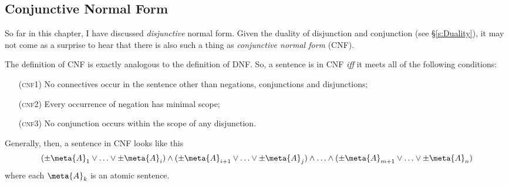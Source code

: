 \subsection{Conjunctive Normal Form}\label{s:CNF}
So far in this chapter, I have discussed \emph{disjunctive} normal form. Given the duality of disjunction and conjunction (see \S\ref{s:Duality}), it may not come as a surprise to hear that there is also such a thing as \emph{conjunctive normal form} (CNF).

The definition of CNF is exactly analogous to the definition of DNF. So, a sentence is in CNF \emph{iff} it meets all of the following conditions:
	\begin{itemize}
		\item[(\textsc{cnf1})] No connectives occur in the sentence other than negations, conjunctions and disjunctions;
		\item[(\textsc{cnf2})] Every occurrence of negation has minimal scope;
		\item[(\textsc{cnf3})] No conjunction occurs within the scope of any disjunction. 
	\end{itemize}
Generally, then, a sentence in CNF looks like this
	$$(\pm \meta{A}_1 \lor \ldots \lor \pm \meta{A}_i) \land (\pm \meta{A}_{i+1} \lor \ldots \lor \pm\meta{A}_j) \land \ldots \land (\pm\meta{A}_{m+1} \lor\ldots \lor \pm \meta{A}_n)$$
where each $\meta{A}_k$ is an atomic sentence.

